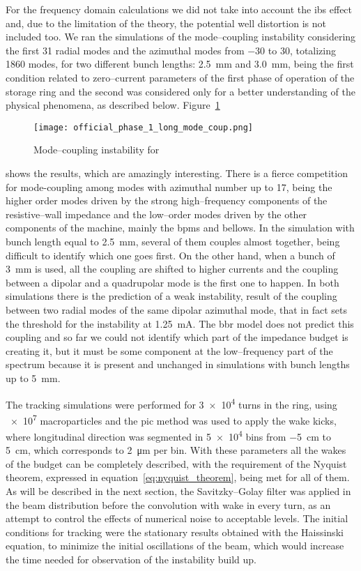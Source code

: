     For the frequency domain calculations we did not take into account the \gls{ibs} effect and, due to the limitation of the theory, the potential well distortion is not included too. We ran the simulations of the mode--coupling instability considering the first \num{31} radial modes and the azimuthal modes from \num{-30} to \num{30}, totalizing \num{1860} modes, for two different bunch lengths: \SI{2.5}{\milli\meter} and \SI{3.0}{\milli\meter}, being the first condition related to zero--current parameters of the first phase of operation of the storage ring and the second was considered only for a better understanding of the physical phenomena, as described below.
    Figure~\ref{fig:ph1_long_mode_coup}
    \begin{figure}
        \centering
        \texttt{[image: official\_phase\_1\_long\_mode\_coup.png]}
        \caption{Mode--coupling instability for }
        \label{fig:ph1_long_mode_coup}
    \end{figure}
    shows the results, which are amazingly interesting. There is a fierce competition for mode-coupling among modes with azimuthal number up to \num{17}, being the higher order modes driven by the strong high--frequency components of the resistive--wall impedance and the low--order modes driven by the other components of the machine, mainly the \glspl{bpm} and bellows. In the simulation with bunch length equal to \SI{2.5}{\milli\meter}, several of them couples almost together, being difficult to identify which one goes first. On the other hand, when a bunch of \SI{3}{\milli\meter} is used, all the coupling are shifted to higher currents and the coupling between a dipolar and a quadrupolar mode is the first one to happen. In both simulations there is the prediction of a weak instability, result of the coupling between two radial modes of the same dipolar azimuthal mode, that in fact sets the threshold for the instability at \SI{1.25}{\milli\ampere}. The \gls{bbr} model does not predict this coupling and so far we could not identify which part of the impedance budget is creating it, but it must be some component at the low--frequency part of the spectrum because it is present and unchanged in simulations with bunch lengths up to \SI{5}{\milli\meter}.

    The tracking simulations were performed for \num{3e4} turns in the ring, using \num{e7} macroparticles and the \gls{pic} method was used to apply the wake kicks, where longitudinal direction was segmented in \num{5e4} bins from \SI{-5}{\centi\meter} to \SI{5}{\centi\meter}, which corresponds to \SI{2}{\micro\meter} per bin. With these parameters all the wakes of the budget can be completely described, with the requirement of the Nyquist theorem, expressed in equation~\eqref{eq:nyquist_theorem}, being met for all of them. As will be described in the next section, the Savitzky--Golay filter was applied in the beam distribution before the convolution with wake in every turn, as an attempt to control the effects of numerical noise to acceptable levels. The initial conditions for tracking were the stationary results obtained with the Haissinski equation, to minimize the initial oscillations of the beam, which would increase the time needed for observation of the instability build up.

